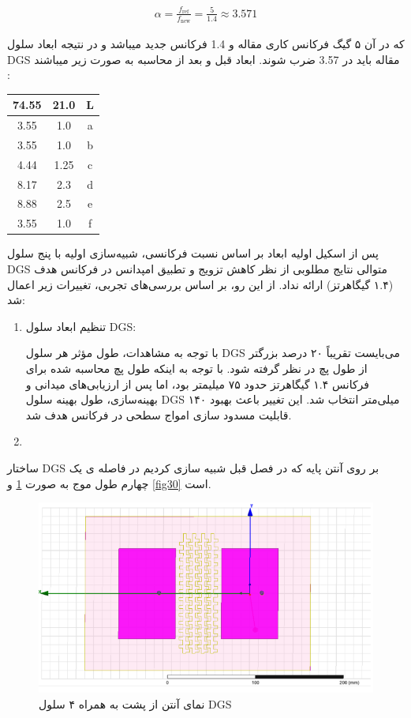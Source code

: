   \begin{align}
 	\label{eq:eq13}
 	\alpha = \frac{f_{\text{ref}}}{f_{\text{new}}} = \frac{5}{1.4} \approx 3.571
 \end{align}
 
 که در آن ۵ گیگ فرکانس کاری مقاله و 1.4 فرکانس جدید میباشد و در نتیجه ابعاد سلول DGS مقاله باید در 3.57 ضرب شوند.
 ابعاد قبل و بعد از محاسبه به صورت زیر میباشند : 
 \begin{center}
 \begin{tabular}{|c|c|c|}
 	\hline
 	74.55 & 21.0 & L \\
 	\hline
 	3.55 & 1.0 & a \\
 	\hline
 	3.55 & 1.0 & b \\
 	\hline
 	4.44 & 1.25 & c \\
 	\hline
 	8.17 & 2.3 & d \\
 	\hline
 	8.88 & 2.5 & e \\
 	\hline
 	3.55 & 1.0 & f \\
 	\hline
 \end{tabular}
 \end{center}
 
پس از اسکیل اولیه ابعاد بر اساس نسبت فرکانسی، شبیه‌سازی اولیه با پنج سلول DGS متوالی نتایج مطلوبی از نظر کاهش تزویج و تطبیق امپدانس در فرکانس هدف (۱.۴ گیگاهرتز) ارائه نداد. از این رو، بر اساس بررسی‌های تجربی، تغییرات زیر اعمال شد:
 \begin{enumerate}
 	\item{
 		تنظیم ابعاد سلول DGS:
 		
 		با توجه به مشاهدات، طول مؤثر هر سلول DGS می‌بایست تقریباً ۲۰ درصد بزرگتر از طول پچ  در نظر گرفته شود. با توجه به اینکه طول پچ محاسبه شده برای فرکانس ۱.۴ گیگاهرتز حدود ۷۵ میلیمتر بود، اما پس از ارزیابی‌های میدانی و بهینه‌سازی، طول بهینه سلول DGS ۱۴۰ میلی‌متر انتخاب شد. این تغییر باعث بهبود قابلیت مسدود سازی امواج سطحی در فرکانس هدف شد.
 		}
 	\item{
 	
 	}
 \end{enumerate}
 
 ساختار DGS بر روی آنتن پایه که در فصل قبل شبیه سازی کردیم در فاصله ی یک چهارم طول موج به صورت 
 \ref{fig29}
 و
 \ref{fig30}
  است.
  
 \begin{figure}
 	\centering
 	\includegraphics[scale=0.5]{Images/fig29.png}
 	\caption{نمای آنتن از پشت به همراه ۴ سلول DGS}
 	\label{fig29}
 \end{figure}
 
